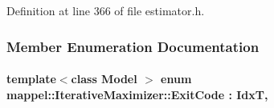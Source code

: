 Definition at line 366 of file estimator.\+h.



\subsubsection{Member Enumeration Documentation}
\paragraph[{\texorpdfstring{Exit\+Code}{ExitCode}}]{\setlength{\rightskip}{0pt plus 5cm}template$<$class Model $>$ enum {\bf mappel\+::\+Iterative\+Maximizer\+::\+Exit\+Code} \+: {\bf IdxT}\hspace{0.3cm}{\ttfamily [strong]}, {\ttfamily [inherited]}}\hypertarget{classmappel_1_1IterativeMaximizer_a5dc8660cf33abf3f3a576f051466521c}{}\label{classmappel_1_1IterativeMaximizer_a5dc8660cf33abf3f3a576f051466521c}
